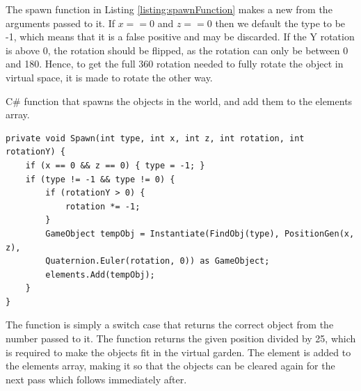 The spawn function in Listing \ref{listing:spawnFunction} makes a new  from the arguments passed to it. If $x == 0$ and $z == 0$ then we default the type to be -1, which means that it is a false positive and may be discarded. If the Y rotation is above 0, the rotation should be flipped, as the rotation can only be between 0 and 180. Hence, to get the full 360 rotation needed to fully rotate the object in virtual space, it is made to rotate the other way.
\begin{listing}[H]
	\caption{C\# function that spawns the objects in the world, and add them to the elements array.}
	\begin{verbatim}
private void Spawn(int type, int x, int z, int rotation, int rotationY) {
	if (x == 0 && z == 0) { type = -1; }
	if (type != -1 && type != 0) {
		if (rotationY > 0) {
			rotation *= -1;
		}
		GameObject tempObj = Instantiate(FindObj(type), PositionGen(x, z),
		Quaternion.Euler(rotation, 0)) as GameObject;
		elements.Add(tempObj);
	}
}
	\end{verbatim}
\label{listing:spawnFunction}
\end{listing}
The  function is simply a switch case that returns the correct object from the number passed to it. The  function returns the given position divided by 25, which is required to make the objects fit in the virtual garden. The element is added to the elements array, making it so that the objects can be cleared again for the next pass which follows immediately after.

